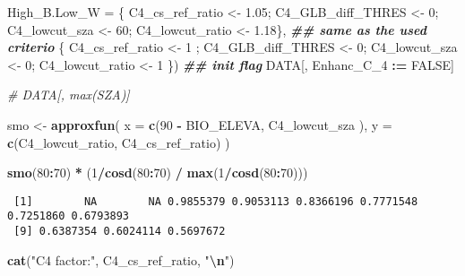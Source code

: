 \documentclass[
  10pt,
  a4paper,oneside]{article}
\newenvironment{Shaded}{\begin{snugshade}}{\end{snugshade}}
\newcommand{\AttributeTok}[1]{\textcolor[rgb]{0.13,0.29,0.53}{#1}}
\newcommand{\CommentTok}[1]{\textcolor[rgb]{0.56,0.35,0.01}{\textit{#1}}}
\newcommand{\ConstantTok}[1]{\textcolor[rgb]{0.56,0.35,0.01}{#1}}
\newcommand{\DecValTok}[1]{\textcolor[rgb]{0.00,0.00,0.81}{#1}}
\newcommand{\DocumentationTok}[1]{\textcolor[rgb]{0.56,0.35,0.01}{\textbf{\textit{#1}}}}
\newcommand{\FloatTok}[1]{\textcolor[rgb]{0.00,0.00,0.81}{#1}}
\newcommand{\FunctionTok}[1]{\textcolor[rgb]{0.13,0.29,0.53}{\textbf{#1}}}
\newcommand{\NormalTok}[1]{#1}
\newcommand{\OtherTok}[1]{\textcolor[rgb]{0.56,0.35,0.01}{#1}}
\newcommand{\SpecialCharTok}[1]{\textcolor[rgb]{0.81,0.36,0.00}{\textbf{#1}}}
\newcommand{\StringTok}[1]{\textcolor[rgb]{0.31,0.60,0.02}{#1}}
\begin{document}
\begin{Shaded}
\begin{Highlighting}[]
       \AttributeTok{High\_B.Low\_W    =}\NormalTok{ \{ C4\_cs\_ref\_ratio }\OtherTok{\textless{}{-}} \FloatTok{1.05}\NormalTok{; C4\_GLB\_diff\_THRES }\OtherTok{\textless{}{-}}  \DecValTok{0}\NormalTok{; C4\_lowcut\_sza }\OtherTok{\textless{}{-}} \DecValTok{60}\NormalTok{; C4\_lowcut\_ratio }\OtherTok{\textless{}{-}} \FloatTok{1.18}\NormalTok{\}, }\DocumentationTok{\#\# same as the used criterio}
\NormalTok{                         \{ C4\_cs\_ref\_ratio }\OtherTok{\textless{}{-}} \DecValTok{1}\NormalTok{   ; C4\_GLB\_diff\_THRES }\OtherTok{\textless{}{-}}  \DecValTok{0}\NormalTok{; C4\_lowcut\_sza }\OtherTok{\textless{}{-}}  \DecValTok{0}\NormalTok{; C4\_lowcut\_ratio }\OtherTok{\textless{}{-}} \DecValTok{1}\NormalTok{   \})}
\DocumentationTok{\#\# init flag}
\NormalTok{DATA[, Enhanc\_C\_4 }\SpecialCharTok{:=} \ConstantTok{FALSE}\NormalTok{]}

\CommentTok{\# DATA[, max(SZA)]}

\NormalTok{smo }\OtherTok{\textless{}{-}} \FunctionTok{approxfun}\NormalTok{(}
    \AttributeTok{x =} \FunctionTok{c}\NormalTok{(}\DecValTok{90} \SpecialCharTok{{-}}\NormalTok{ BIO\_ELEVA, C4\_lowcut\_sza  ),}
    \AttributeTok{y =} \FunctionTok{c}\NormalTok{(C4\_lowcut\_ratio,  C4\_cs\_ref\_ratio)}
\NormalTok{    )}

\FunctionTok{smo}\NormalTok{(}\DecValTok{80}\SpecialCharTok{:}\DecValTok{70}\NormalTok{) }\SpecialCharTok{*}\NormalTok{ (}\DecValTok{1}\SpecialCharTok{/}\FunctionTok{cosd}\NormalTok{(}\DecValTok{80}\SpecialCharTok{:}\DecValTok{70}\NormalTok{) }\SpecialCharTok{/} \FunctionTok{max}\NormalTok{(}\DecValTok{1}\SpecialCharTok{/}\FunctionTok{cosd}\NormalTok{(}\DecValTok{80}\SpecialCharTok{:}\DecValTok{70}\NormalTok{)))}
\end{Highlighting}
\end{Shaded}

\begin{verbatim}
 [1]        NA        NA 0.9855379 0.9053113 0.8366196 0.7771548 0.7251860 0.6793893
 [9] 0.6387354 0.6024114 0.5697672
\end{verbatim}

\begin{Shaded}
\begin{Highlighting}[]
\FunctionTok{cat}\NormalTok{(}\StringTok{"C4 factor:"}\NormalTok{, C4\_cs\_ref\_ratio,   }\StringTok{"}\SpecialCharTok{\textbackslash{}n}\StringTok{"}\NormalTok{)}
\end{Highlighting}
\end{Shaded}
\end{document}
